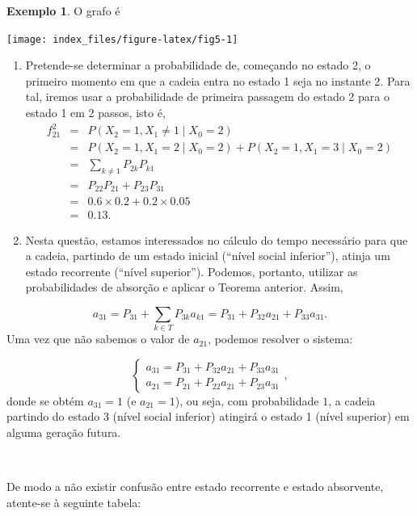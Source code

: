 \documentclass[
  11pt,
  a4paper,
]{book}
\theoremstyle{definition}
\theoremstyle{definition}
\newtheorem{example}{Exemplo}[chapter]
\theoremstyle{definition}
\theoremstyle{definition}
\theoremstyle{remark}
\begin{document}
\begin{example}
O grafo é

\begin{center}\texttt{[image: index\_files/figure-latex/fig5-1]} \end{center}

\begin{enumerate}
\def\labelenumi{\arabic{enumi}.}
\item
  Pretende-se determinar a probabilidade de, começando no estado 2, o primeiro momento em que a cadeia entra no estado 1 seja no instante 2. Para tal, iremos usar a probabilidade de primeira passagem do estado 2 para o estado 1 em 2 passos, isto é,
  \begin{eqnarray*}
  f_{21}^2 &=& P(X_2=1, X_1 \neq 1 \mid X_0=2) \\
        &=& P(X_2=1, X_1 = 2 \mid X_0=2)+P(X_2=1, X_1 = 3 \mid X_0=2)\\
        &=& \sum\limits_{k \neq 1} P_{2k}P_{k1}\\
        &=& P_{22}P_{21}+P_{23}P_{31}\\
        &=& 0.6 \times 0.2 + 0.2 \times 0.05\\
        &=& 0.13.
  \end{eqnarray*}
\item
  Nesta questão, estamos interessados no cálculo do tempo necessário para que a cadeia, partindo de um estado inicial (``nível social inferior''), atinja um estado recorrente (``nível superior''). Podemos, portanto, utilizar as probabilidades de absorção e aplicar o Teorema anterior. Assim,
\end{enumerate}

\[a_{31}=P_{31}+\sum\limits_{k \in T} P_{3k}a_{k1}=P_{31}+P_{32}a_{21}+P_{33}a_{31}.\]
Uma vez que não sabemos o valor de \(a_{21}\), podemos resolver o sistema:

\[
\begin{cases}
a_{31} = P_{31} + P_{32} a_{21} + P_{33} a_{31} \\
a_{21} = P_{21} + P_{22} a_{21} + P_{23} a_{31}
\end{cases}, 
\]
donde se obtém \(a_{31}=1\) (e \(a_{21}=1\)), ou seja, com probabilidade \(1\), a cadeia partindo do estado 3 (nível social inferior) atingirá o estado 1 (nível superior) em alguma geração futura.
\end{example}

\(\,\)

De modo a não existir confusão entre estado recorrente e estado absorvente, atente-se à seguinte tabela:
\end{document}
